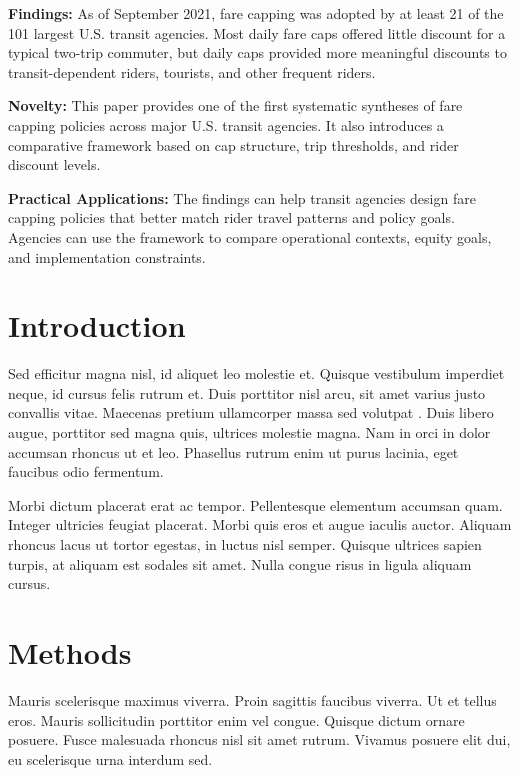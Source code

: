\documentclass[10pt,numbered]{trbunofficial}
\begin{document}
\noindent\textbf{Findings:} As of September 2021, fare capping was adopted by at
least 21 of the 101 largest U.S. transit agencies. Most daily fare caps offered
little discount for a typical two-trip commuter, but daily caps provided more
meaningful discounts to transit-dependent riders, tourists, and other frequent
riders.
\par\vspace{\baselineskip}

\noindent\textbf{Novelty:} This paper provides one of the first systematic
syntheses of fare capping policies across major U.S. transit agencies. It also
introduces a comparative framework based on cap structure, trip thresholds, and
rider discount levels.
\par\vspace{\baselineskip}

\noindent\textbf{Practical Applications:} The findings can help transit agencies
design fare capping policies that better match rider travel patterns and policy
goals. Agencies can use the framework to compare operational contexts, equity
goals, and implementation constraints.
\par\endgroup
\newpage

\section{Introduction}\label{sec:intro}
Sed efficitur magna nisl, id aliquet leo molestie et. Quisque vestibulum
imperdiet neque, id cursus felis rutrum et. Duis porttitor nisl arcu, sit amet
varius justo convallis vitae. Maecenas pretium ullamcorper massa sed volutpat
\citep{smith2020}. Duis libero augue, porttitor sed magna quis, ultrices
molestie magna. Nam in orci in dolor accumsan rhoncus ut et leo. Phasellus
rutrum enim ut purus lacinia, eget faucibus odio fermentum.

Morbi dictum placerat erat ac tempor. Pellentesque elementum accumsan quam.
Integer ultricies feugiat placerat. Morbi quis eros et augue iaculis auctor.
Aliquam rhoncus lacus ut tortor egestas, in luctus nisl semper. Quisque
ultrices sapien turpis, at aliquam est sodales sit amet. Nulla congue risus in
ligula aliquam cursus.

\section{Methods}
Mauris scelerisque maximus viverra. Proin sagittis faucibus viverra. Ut et
tellus eros. Mauris sollicitudin porttitor enim vel congue. Quisque dictum
ornare posuere. Fusce malesuada rhoncus nisl sit amet rutrum. Vivamus posuere
elit dui, eu scelerisque urna interdum sed.
\end{document}
